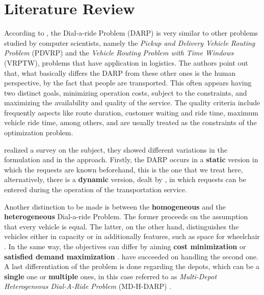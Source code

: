 \documentclass[tuberlin,cic,tc,openright,english,noabntcite,oneside]{iiufrgs}
\begin{document}
\chapter{Literature Review}
According to \textcite[p. 30]{cordeau_dial--ride_2007}, the Dial-a-ride Problem (DARP) is very similar to other problems studied by computer scientists, namely the \emph{Pickup and Delivery Vehicle Routing Problem} (PDVRP) and the \emph{Vehicle Routing Problem with Time Windows} (VRPTW), problems that have application in logistics. The authors point out that, what basically differs the DARP from these other ones is the human perspective, by the fact that people are transported. This often appears having two distinct goals, minimizing operation costs, subject to the constraints, and maximizing the availability and quality of the service. The quality criteria include frequently aspects like route duration, customer waiting and ride time, maximum vehicle ride time, among others, and are usually treated as the constraints of the optimization problem.

\textcite{cordeau_dial--ride_2007} realized a survey on the subject, they showed different variations in the formulation and in the approach. Firstly, the DARP occurs in a \textbf{static} version in which the requests are known beforehand, this is the one that we treat here, alternatively, there is a \textbf{dynamic} version, dealt by \textcite{berbeglia_dynamic_2010}, in which requests can be entered during the operation of the transportation service.

Another distinction to be made is between the \textbf{homogeneous} and the \textbf{heterogeneous} Dial-a-ride Problem. The former proceeds on the assumption that every vehicle is equal. The latter, on the other hand, distinguishes the vehicles either in capacity or in additionally features, such as space for wheelchair  \parencite[p. 593]{parragh_models_2012}. In the same way, the objectives can differ by aiming \textbf{cost minimization} or \textbf{satisfied demand maximization} \parencite[p. 30]{cordeau_dial--ride_2007}. \textcite{urra_hyperheuristic_2015} have succeeded on handling the second one. A last differentiation of the problem is done regarding the depots, which can be a \textbf{single} one or \textbf{multiple} ones, in this case referred to as \emph{Multi-Depot Heterogeneous Dial-A-Ride Problem} (MD-H-DARP) \parencite[p. 166]{braekers_exact_2014}.
\end{document}

